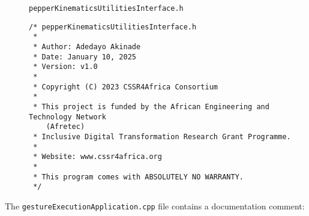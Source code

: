 \documentclass{CSSRforAfrica}
\newcommand{\blank}{~\\}
\newcommand{\checkboxChecked}{\fbox{\ding{51}}} %
\begin{document}
\begin{description}
\item[\checkboxChecked] {\small \verb+pepperKinematicsUtilitiesInterface.h+}   
{\small \begin{verbatim}
/* pepperKinematicsUtilitiesInterface.h
 *
 * Author: Adedayo Akinade
 * Date: January 10, 2025
 * Version: v1.0
 * 
 * Copyright (C) 2023 CSSR4Africa Consortium
 * 
 * This project is funded by the African Engineering and Technology Network 
    (Afretec) 
 * Inclusive Digital Transformation Research Grant Programme. 
 *
 * Website: www.cssr4africa.org
 *
 * This program comes with ABSOLUTELY NO WARRANTY.
 */
\end{verbatim} }

\end{description} 
%
\noindent The {\small \verb+gestureExecutionApplication.cpp+} file contains a documentation comment:
\end{document}

